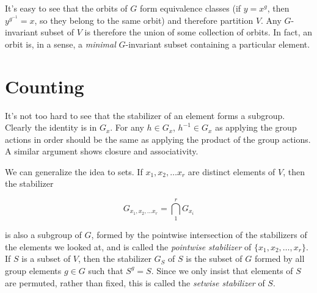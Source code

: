 

It's easy to see that the orbits of $G$ form equivalence classes (if $y=x^g$, then $y^{g^{-1}}=x$, so they belong to the same orbit) and therefore partition $V$.  Any $G$-invariant subset of $V$ is therefore the union of some collection of orbits.  In fact, an orbit is, in a sense, a \textit{minimal} $G$-invariant subset containing a particular element.

\section*{Counting}


It's not too hard to see that the stabilizer of an element forms a subgroup.  Clearly the identity is in $G_x$.  For any $h\in G_x$, $h^{-1}\in G_x$ as applying the group actions in order should be the same as applying the product of the group actions.  A similar argument shows closure and associativity.

We can generalize the idea to sets.  If $x_1,x_2,\dots x_r$ are distinct elements of $V$, then the stabilizer 

$$G_{x_1,x_2,\dots x_r} = \bigcap\limits_{1}^r G_{x_i}$$

is also a subgroup of $G$, formed by the pointwise intersection of the stabilizers of the elements we looked at, and is called the \textit{pointwise stabilizer} of $\{x_1,x_2,\dots,x_r\}$.  If $S$ is a subset of $V$, then the stabilizer $G_S$ of $S$ is the subset of $G$ formed by all group elements $g\in G$ such that $S^g=S$.  Since we only insist that elements of $S$ are permuted, rather than fixed, this is called the \textit{setwise stabilizer} of $S$.


